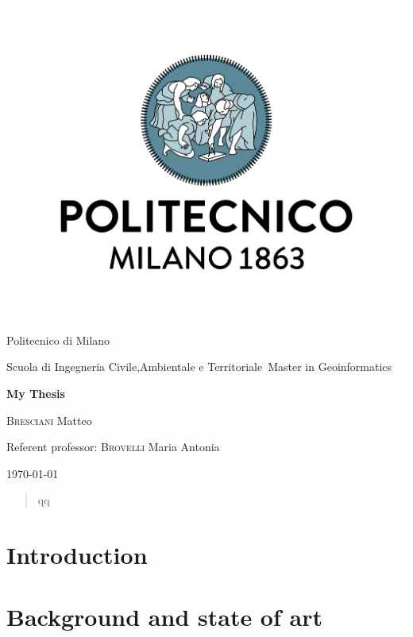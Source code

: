 \documentclass[fontsize=11pt,paper=a4,pagesize=auto]{report}
\begin{document}
\begin{titlepage}
	\centering
	\includegraphics[scale = 0.20]{images/polimi.jpg}\par
	{\Large
		Politecnico di Milano\par
		Scuola di Ingegneria Civile,Ambientale e Territoriale\
		Master in Geoinformatics\par}
			\vspace{0.5cm}
	{\huge\bfseries
		My Thesis\\\par}
	\vspace{1cm}
	{\Large
		{\scshape Bresciani} Matteo\par}
	\vfill
	Referent professor: {\scshape Brovelli} Maria Antonia\par
	\vfill
	{\large\today\par}
\end{titlepage}


\tableofcontents


\begin{abstract}
qq
\end{abstract}

\chapter{Introduction}
 

\chapter{Background and state of art}

\end{document}
